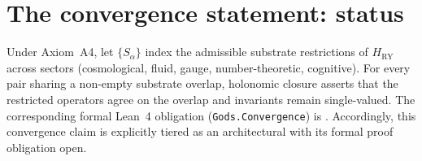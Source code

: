 \documentclass{alienfolio}
\begin{document}
\section{The convergence statement: status}
\label{sec:convergence-thm}

Under Axiom~A4, let $\{S_{\alpha}\}$ index the admissible substrate
restrictions of $H_{\mathrm{RY}}$ across sectors (cosmological, fluid,
gauge, number-theoretic, cognitive). For every pair sharing a non-empty
substrate overlap, holonomic closure asserts that the restricted
operators agree on the overlap and invariants remain single-valued. The
corresponding formal Lean~4 obligation (\texttt{Gods.Convergence}) is
. Accordingly, this convergence claim is explicitly
tiered as an architectural  with its formal proof
obligation open.

\goldrule
\end{document}
